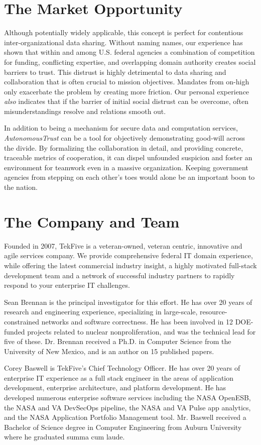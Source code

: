 \documentclass[10pt, twoside]{article}
\newcommand{\projectName}{\emph{AutonomousTrust }}
\begin{document}
\section{The Market Opportunity}

Although potentially widely applicable, this concept is perfect for contentious inter-organizational data sharing. Without naming names, our experience has shown that within and among U.S. federal agencies a combination of competition for funding, conflicting expertise, and overlapping domain authority creates social barriers to trust. This distrust is highly detrimental to data sharing and collaboration that is often crucial to mission objectives. Mandates from on-high only exacerbate the problem by creating more friction. Our personal experience \emph{also} indicates that if the barrier of initial social distrust can be overcome, often misunderstandings resolve and relations smooth out.

In addition to being a mechanism for secure data and computation services, \projectName can be a tool for objectively demonstrating good-will across the divide. By formalizing the collaboration in detail, and providing concrete, traceable metrics of cooperation, it can dispel unfounded suspicion and foster an environment for teamwork even in a massive organization. Keeping government agencies from stepping on each other's toes would alone be an important boon to the nation.

\section{The Company and Team}

Founded in 2007, TekFive is a veteran-owned, veteran centric, innovative and agile services company. We provide comprehensive federal IT domain experience, while offering the latest commercial industry insight, a highly motivated full-stack development team and a network of successful industry partners to rapidly respond to your enterprise IT challenges.

Sean Brennan is the principal investigator for this effort. He has over 20 years of research and engineering experience, specializing in large-scale, resource-constrained networks and software correctness. He has been involved in 12 DOE-funded projects related to nuclear nonproliferation, and was the technical lead for five of these.
Dr. Brennan received a Ph.D. in Computer Science from the University of New Mexico, and is an author on 15 published papers.

Corey Baswell is TekFive's Chief Technology Officer. He has over 20 years of enterprise IT experience as a full stack engineer in the areas of application development, enterprise architecture, and platform development. He has developed numerous enterprise software services including the NASA OpenESB, the NASA and VA DevSecOps pipeline, the NASA and VA Pulse app analytics, and the NASA Application Portfolio Management tool.
Mr. Baswell received a Bachelor of Science degree in Computer Engineering from Auburn University where he graduated summa cum laude.
\end{document}
